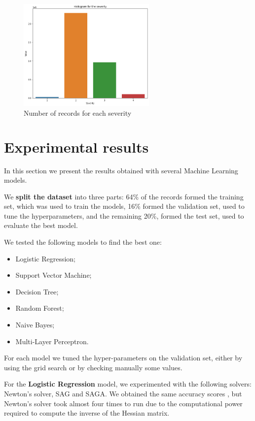 \documentclass{article}
\begin{document}
\begin{figure}[h!]
\centering
\includegraphics[width=0.6\textwidth]{unbalanced-dataset}
\caption{Number of records for each severity}
\label{img:unbalanced-dataset}
\end{figure}

\section{Experimental results}
In this section we present the results obtained with several Machine Learning models.

We \textbf{split the dataset} into three parts: 64\% of the records formed the training set, which was used to train the models, 16\% formed the validation set, used to tune the hyperparameters, and the remaining 20\%, formed the test set, used to evaluate the best model.

We tested the following models to find the best one:

\begin{itemize}
\item Logistic Regression;
\item Support Vector Machine;
\item Decision Tree;
\item Random Forest;
\item Naive Bayes;
\item Multi-Layer Perceptron.
\end{itemize}

For each model we tuned the hyper-parameters on the validation set, either by using the grid search or by checking manually some values.

For the \textbf{Logistic Regression} model, we experimented with the following solvers: Newton's solver, SAG and SAGA. We obtained the same accuracy scores , but Newton's solver took almost four times to run due to the computational power required to compute the inverse of the Hessian matrix.
\end{document}
